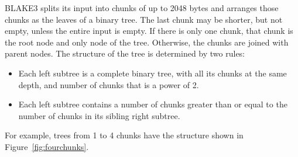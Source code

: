 \documentclass[11pt,notitlepage,a4paper]{article}
\begin{document}
BLAKE3 splits its input into chunks of up to 2048 bytes and arranges those
chunks as the leaves of a binary tree. The last chunk may be shorter, but not
empty, unless the entire input is empty. If there is only one chunk, that chunk
is the root node and only node of the tree. Otherwise, the chunks are joined
with parent nodes. The structure of the tree is determined by two rules:
\begin{itemize}
    \item Each left subtree is a complete binary tree, with all its chunks at
        the same depth, and number of chunks that is a power of 2.
    \item Each left subtree contains a number of chunks greater than or equal
        to the number of chunks in its sibling right subtree.
\end{itemize}
For example, trees from 1 to 4 chunks have the structure shown in
Figure~\ref{fig:fourchunks}.
\end{document}
